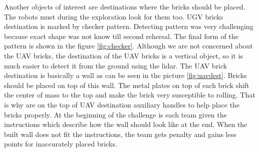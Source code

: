 Another objects of interest are destinations where the bricks should be placed. The robots must during the exploration look for them too. UGV bricks destination is marked by checker pattern. Detecting pattern was very challenging because exact shape was not know till second rehersal. The final form of the pattern is shown in the figure \ref{fig:checker}. Although we are not concerned about the UAV bricks, the destination of the UAV bricks is a vertical object, so it is much easier to detect it from the ground using the lidar. The UAV brick destination is basically a wall as can be seen in the picture \ref{fig:uavdest}. Bricks should be placed on top of this wall. The metal plates on top of each brick shift the center of mass to the top and make the brick very susceptible to rolling. That is why are on the top of UAV destination auxiliary handles to help place the bricks properly. At the beginning of the challenge is each team given the instructions which describe how the wall should look like at the end. When the built wall does not fit the instructions, the team gets penalty and gains less points for inaccurately placed bricks.


